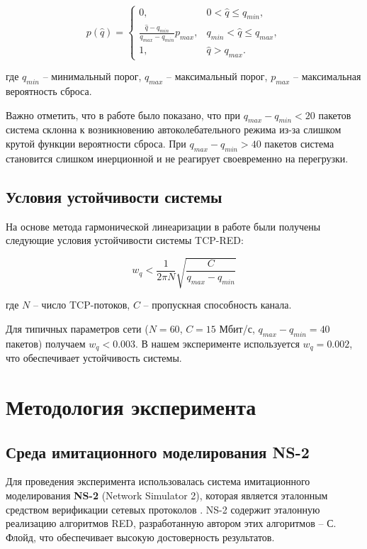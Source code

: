 \documentclass[10pt, conference, twocolumn, a4paper]{article}
\begin{document}
\begin{equation}
p(\hat{q}) = 
\begin{cases} 
0, & 0 < \hat{q} \leq q_{min}, \\
\frac{\hat{q} - q_{min}}{q_{max} - q_{min}} p_{max}, & q_{min} < \hat{q} \leq q_{max}, \\
1, & \hat{q} > q_{max}.
\end{cases}
\label{eq:red_prob}
\end{equation}

где $q_{min}$ -- минимальный порог, $q_{max}$ -- максимальный порог, $p_{max}$ -- максимальная вероятность сброса.

Важно отметить, что в работе \cite{velieva2019phd} было показано, что при $q_{max} - q_{min} < 20$ пакетов система склонна к возникновению автоколебательного режима из-за слишком крутой функции вероятности сброса. При $q_{max} - q_{min} > 40$ пакетов система становится слишком инерционной и не реагирует своевременно на перегрузки.

\subsection{Условия устойчивости системы}
На основе метода гармонической линеаризации в работе \cite{velieva2019phd} были получены следующие условия устойчивости системы TCP-RED:

\begin{equation}
w_q < \frac{1}{2\pi N} \sqrt{\frac{C}{q_{max} - q_{min}}}
\label{eq:stability}
\end{equation}

где $N$ -- число TCP-потоков, $C$ -- пропускная способность канала.

Для типичных параметров сети ($N=60$, $C=15$ Мбит/с, $q_{max}-q_{min}=40$ пакетов) получаем $w_q < 0.003$. В нашем эксперименте используется $w_q = 0.002$, что обеспечивает устойчивость системы.

\section{Методология эксперимента}
\subsection{Среда имитационного моделирования NS-2}
Для проведения эксперимента использовалась система имитационного моделирования \textbf{NS-2} (Network Simulator 2), которая является эталонным средством верификации сетевых протоколов \cite{velieva2019phd}. NS-2 содержит эталонную реализацию алгоритмов RED, разработанную автором этих алгоритмов -- С. Флойд, что обеспечивает высокую достоверность результатов.
\end{document}
